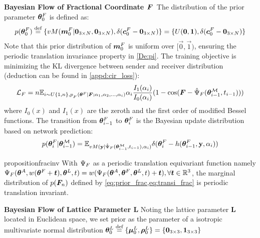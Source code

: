 

\textbf{Bayesian Flow of Fractional Coordinate ${\bm{F}}$}~The distribution of the prior parameter $\bm{\theta}^F_0$ is defined as:
\begin{equation}\label{eq:prior_frac}
    p(\bm{\theta}^F_0) \stackrel{\text{def}}{=} \{vM({\bm{m}}_0^F|\boldsymbol{0}_{3\times N},\boldsymbol{0}_{3\times N}),\delta({\bm{c}}_0^F-\boldsymbol{0}_{3\times N})\} = \{U(\boldsymbol{0},\boldsymbol{1}),\delta({\bm{c}}_0^F-\boldsymbol{0}_{3\times N})\}
\end{equation}
Note that this prior distribution of ${\bm{m}}_0^F$ is uniform over $[\vec{0},\vec{1})$, ensuring the periodic translation invariance property in \cref{De:pi}. The training objective is minimizing the KL divergence between sender and receiver distribution (deduction can be found in \cref{appd:cir_loss}): 
\begin{align}\label{loss_frac}
\mathcal{L}_F = n \mathbb{E}_{i \sim U\{1,n\}, p_{_F}(\boldsymbol{\theta}{}^F \mid {\bm{F}} ; \alpha_1,\alpha_2,\dots,\alpha_i)} \alpha_i\frac{I_1(\alpha_i)}{I_0(\alpha_i)}(1-\cos({\bm{F}}-\hat{\Psi}_F(\bm{\theta}^\mathcal{M}_{i-1}, t_{i-1})))
\end{align}
where $I_0(x)$ and $I_1(x)$ are the zeroth and the first order of modified Bessel functions. The transition from $\bm{\theta}^F_{i-1}$ to $\bm{\theta}^F_{i}$ is the Bayesian update distribution based on network prediction:
\begin{equation}\label{eq:transi_frac}
    p(\bm{\theta}^F_{i}|\boldsymbol{\theta}_{i-1}^{\mathcal{M}})=\mathbb{E}_{vM(\bold{y}|\hat{\Psi}_F(\bm{\theta}^\mathcal{M}_{i-1}, t_{i-1}),\alpha_i)}\delta(\bm{\theta}^F_{i}-h(\bm{\theta}^F_{i-1},\bold{y},\alpha_i))
\end{equation}
\begin{restatable}{proposition}{fracinv}
With $\Psi_{F}$ as a periodic translation equivariant function namely $\Psi_F(\boldsymbol{\theta}_{}^A,w(\boldsymbol{\theta}_{}^F+{\bm{t}}),\boldsymbol{\theta}_{}^L,t)=w(\Psi_F(\boldsymbol{\theta}_{}^A,\boldsymbol{\theta}_{}^F,\boldsymbol{\theta}_{}^L,t)+{\bm{t}}), \forall{\bm{t}}\in\mathbb{R}^3$, the marginal distribution of $p({\bm{F}}_n)$ defined by \cref{eq:prior_frac,eq:transi_frac} is periodic translation invariant. 
\end{restatable}
\textbf{Bayesian Flow of Lattice Parameter \texorpdfstring{$\boldsymbol{L}$}{}}   
Noting the lattice parameter $\bm{L}$ located in Euclidean space, we set prior as the parameter of a isotropic multivariate normal distribution $\bm{\theta}^L_0\stackrel{\text{def}}{=}\{{\bm{\mu}}_0^L,{\bm{\rho}}_0^L\}=\{\bm{0}_{3\times3},\bm{1}_{3\times3}\}$
